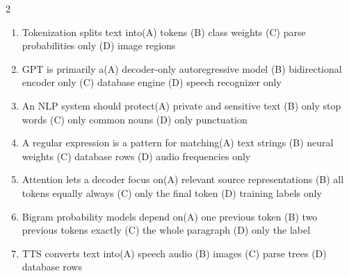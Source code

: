 \documentclass[a4paper]{article}
\begin{document}
\begin{multicols*}{2}
\fontsize{8.5}{10}\selectfont
\begin{enumerate}[resume]
\item Tokenization splits text into\newline\hspace*{0.6em}(A) tokens \quad (B) class weights \newline\hspace*{0.6em}(C) parse probabilities only \quad (D) image regions
\item GPT is primarily a\newline\hspace*{0.6em}(A) decoder-only autoregressive model \quad (B) bidirectional encoder only \newline\hspace*{0.6em}(C) database engine \quad (D) speech recognizer only
\item An NLP system should protect\newline\hspace*{0.6em}(A) private and sensitive text \quad (B) only stop words \newline\hspace*{0.6em}(C) only common nouns \quad (D) only punctuation
\item A regular expression is a pattern for matching\newline\hspace*{0.6em}(A) text strings \quad (B) neural weights \newline\hspace*{0.6em}(C) database rows \quad (D) audio frequencies only
\item Attention lets a decoder focus on\newline\hspace*{0.6em}(A) relevant source representations \quad (B) all tokens equally always \newline\hspace*{0.6em}(C) only the final token \quad (D) training labels only
\item Bigram probability models depend on\newline\hspace*{0.6em}(A) one previous token \quad (B) two previous tokens exactly \newline\hspace*{0.6em}(C) the whole paragraph \quad (D) only the label
\item TTS converts text into\newline\hspace*{0.6em}(A) speech audio \quad (B) images \newline\hspace*{0.6em}(C) parse trees \quad (D) database rows

\end{enumerate}
\end{multicols*}
\end{document}
